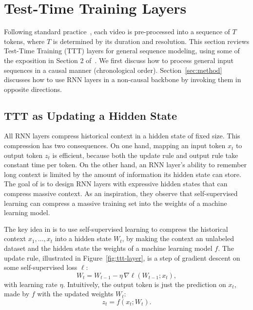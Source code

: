 \section{Test-Time Training Layers}
\label{sec:prelim}

Following standard practice~\cite{meta2024moviegen, yang2024cogvideox}, 
each video is pre-processed into a sequence of $T$ tokens, where $T$ is determined by its duration and resolution.
This section reviews Test-Time Training (TTT) layers for general sequence modeling, using some of the exposition in Section 2 of~\cite{sun2024ttt}.
We first discuss how to process general input sequences in a causal manner (chronological order).
Section~\ref{sec:method} discusses how to use RNN layers in a non-causal backbone by invoking them in opposite directions.

\subsection{TTT as Updating a Hidden State}
\label{subsec:hidden}
All RNN layers compress historical context in a hidden state of fixed size. This compression has two consequences.
On one hand, mapping an input token $x_t$ to output token $z_t$ is efficient, because both the update rule and output rule take constant time per token.
On the other hand, an RNN layer's ability to remember long context is limited by the amount of information its hidden state can store.
The goal of \cite{sun2024ttt} is to design RNN layers with expressive hidden states that can compress massive context.
As an inspiration, they observe that self-supervised learning can compress a massive training set into the weights of a machine learning model.

The key idea in \cite{sun2024ttt} is to use self-supervised learning to compress the historical context $x_1,\dots,x_t$ into a hidden state $W_t$, by making the context an unlabeled dataset and the hidden state the weights of a machine learning model $f$.
The update rule, illustrated in Figure~\ref{fig:ttt-layer}, is a step of gradient descent on some self-supervised loss $\ell$: 
\begin{equation}
\label{eq:update_naive}
W_t = W_{t-1} - \eta\,\nabla\ell(W_{t-1}; x_t),
\end{equation}
with learning rate $\eta$. Intuitively, the output token is just the prediction on $x_t$, made by $f$ with the updated weights $W_t$:
\begin{equation}
\label{eq:output_naive}
z_t = f(x_t; W_t).
\end{equation}

